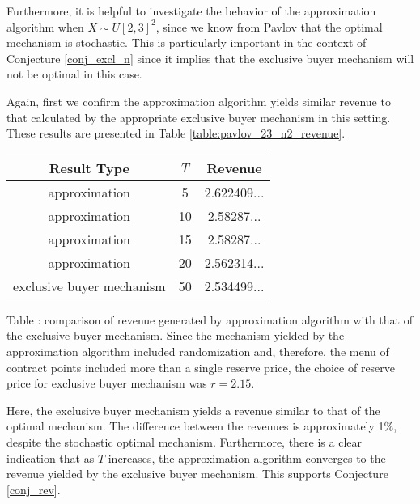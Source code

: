
Furthermore, it is helpful to investigate the behavior of the approximation algorithm when $X \sim U[2,3]^2$, since we know from Pavlov \autocite*{pavlov2011optimal} that the optimal mechanism is stochastic. This is particularly important in the context of Conjecture \ref{conj_excl_n} since it implies that the exclusive buyer mechanism will not be optimal in this case.

Again, first we confirm the approximation algorithm yields similar revenue to that calculated by the appropriate exclusive buyer mechanism in this setting. These results are presented in Table \ref{table:pavlov_23_n2_revenue}.

\begin{center}
    \begin{tabular}{ |c|c|c| } 
    \hline
    Result Type & $T$ & Revenue \\
    \hline
    \hline
    approximation & 5 & 2.622409... \\ 
    approximation & 10 & 2.58287... \\ 
    approximation & 15 & 2.58287... \\ 
    approximation & 20 & 2.562314... \\ 
    exclusive buyer mechanism & 50 & 2.534499... \\
    \hline
    \end{tabular}

    \vspace{1mm}
    \raggedright{\small {\sc Table \thefig\label{table:pavlov_23_n2_revenue}:} comparison of revenue generated by approximation algorithm with that of the exclusive buyer mechanism. Since the mechanism yielded by the approximation algorithm included randomization and, therefore, the menu of contract points included more than a single reserve price, the choice of reserve price for exclusive buyer mechanism was $r=2.15$.}
\end{center}

\noindent Here, the exclusive buyer mechanism yields a revenue similar to that of the optimal mechanism. The difference between the revenues is approximately 1\%, despite the stochastic optimal mechanism. Furthermore, there is a clear indication that as $T$ increases, the approximation algorithm converges to the revenue yielded by the exclusive buyer mechanism. This supports Conjecture \ref{conj_rev}.

